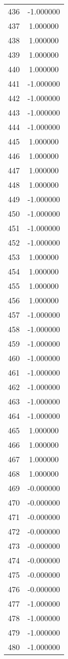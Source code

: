 \documentclass[12pt]{article}
\begin{document}
\begin{longtable}{@{}cc@{}}
436 & -1.000000 \\
437 & 1.000000 \\
438 & 1.000000 \\
439 & 1.000000 \\
440 & 1.000000 \\
441 & -1.000000 \\
442 & -1.000000 \\
443 & -1.000000 \\
444 & -1.000000 \\
445 & 1.000000 \\
446 & 1.000000 \\
447 & 1.000000 \\
448 & 1.000000 \\
449 & -1.000000 \\
450 & -1.000000 \\
451 & -1.000000 \\
452 & -1.000000 \\
453 & 1.000000 \\
454 & 1.000000 \\
455 & 1.000000 \\
456 & 1.000000 \\
457 & -1.000000 \\
458 & -1.000000 \\
459 & -1.000000 \\
460 & -1.000000 \\
461 & -1.000000 \\
462 & -1.000000 \\
463 & -1.000000 \\
464 & -1.000000 \\
465 & 1.000000 \\
466 & 1.000000 \\
467 & 1.000000 \\
468 & 1.000000 \\
469 & -0.000000 \\
470 & -0.000000 \\
471 & -0.000000 \\
472 & -0.000000 \\
473 & -0.000000 \\
474 & -0.000000 \\
475 & -0.000000 \\
476 & -0.000000 \\
477 & -1.000000 \\
478 & -1.000000 \\
479 & -1.000000 \\
480 & -1.000000 \\

\end{longtable}
\end{document}
